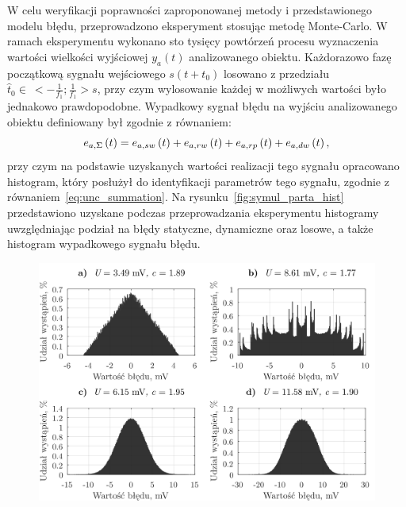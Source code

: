 W celu weryfikacji poprawności zaproponowanej metody i przedstawionego modelu błędu, przeprowadzono eksperyment stosując metodę Monte-Carlo. W ramach eksperymentu wykonano sto tysięcy powtórzeń procesu wyznaczenia wartości wielkości wyjściowej $y_{a}(t)$ analizowanego obiektu. Każdorazowo fazę początkową sygnału wejściowego $s(t+t_{0})$ losowano z przedziału $\hat{t}_{0} \in~<-\frac{1}{f_{1}};\frac{1}{f_{1}}>\unit{s}$, przy czym wylosowanie każdej w możliwych wartości było jednakowo prawdopodobne. Wypadkowy sygnał błędu na wyjściu analizowanego obiektu definiowany był zgodnie z równaniem:
\begin{equation}
e_{a,\Sigma} \left(t\right) = e_{a,sw} \left(t\right) + e_{a,rw} \left(t\right) + e_{a,rp} \left(t\right) + e_{a,dw} \left(t\right) \label{eq:sym_parta_error_sum},
\end{equation}
przy czym na podstawie uzyskanych wartości realizacji tego sygnału opracowano histogram, który posłużył do identyfikacji parametrów tego sygnału, zgodnie z równaniem~\eqref{eq:unc_summation}. Na rysunku~\ref{fig:symul_parta_hist} przedstawiono uzyskane podczas przeprowadzania eksperymentu histogramy uwzględniając podział na błędy statyczne, dynamiczne oraz losowe, a także histogram wypadkowego sygnału błędu.

\begin{figure}[htb!]
\begin{center}
\includegraphics{obrazki/hist_part_a}
\end{center}
\end{figure}

